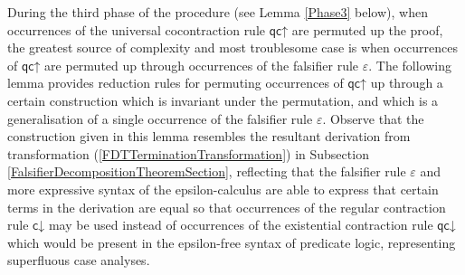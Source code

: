 \documentclass[10pt]{article}
\theoremstyle{definition}\newtheorem{remark}[theorem]{Remark}
\theoremstyle{definition}\newtheorem{example}[theorem]{Example}
\theoremstyle{definition}\newtheorem{definition}[theorem]{Definition}
\newcommand{\cDown}{{\mathsf{c\mathord\downarrow}}}
\newcommand{\qcUp}{{\mathsf{qc\mathord\uparrow}}}
\newcommand{\qcDown}{{\mathsf{qc\mathord\downarrow}}}
\newcommand{\falsifierRule}{{\mathsf{\varepsilon}}}
\begin{document}
	During the third phase of the procedure (see Lemma \ref{Phase3} below), when occurrences of the universal cocontraction rule $\qcUp$ are permuted up the proof, the greatest source of complexity and most troublesome case is when occurrences of $\qcUp$ are permuted up through occurrences of the falsifier rule $\falsifierRule$. The following lemma provides reduction rules for permuting occurrences of $\qcUp$ up through a certain construction which is invariant under the permutation, and which is a generalisation of a single occurrence of the falsifier rule $\falsifierRule$. Observe that the construction given in this lemma resembles the resultant derivation from transformation (\ref{FDTTerminationTransformation}) in Subsection \ref{FalsifierDecompositionTheoremSection}, reflecting that the falsifier rule $\falsifierRule$ and more expressive syntax of the epsilon-calculus are able to express that certain terms in the derivation are equal so that occurrences of the regular contraction rule $\cDown$ may be used instead of occurrences of the existential contraction rule $\qcDown$ which would be present in the epsilon-free syntax of predicate logic, representing superfluous case analyses.
	
\end{document}
